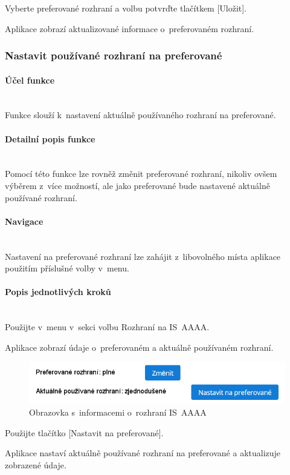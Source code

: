 \documentclass[thesis=M,czech]{FITthesis}[2019/12/23]
\newcommand{\lbparagraph}[1]{\paragraph{#1}\mbox{}\\} %
\newenvironment{reusefigure}[2][htbp]
  {\addtocounter{figure}{-1}%
   \renewcommand{\theHfigure}{dupe-fig}%
   \renewcommand{\thefigure}{\ref{#2}}%
   \renewcommand{\addcontentsline}[3]{}%
   \begin{figure}[#1]}
  {\end{figure}} %
\begin{document}
Vyberte preferované rozhraní a volbu potvrďte tlačítkem [Uložit].

Aplikace zobrazí aktualizované informace o~preferovaném rozhraní.

\newpage
\subsubsection{Nastavit používané rozhraní na preferované}
\lbparagraph{Účel funkce}
Funkce slouží k~nastavení aktuálně používaného rozhraní na preferované.

\lbparagraph{Detailní popis funkce}
Pomocí této funkce lze rovněž změnit preferované rozhraní, nikoliv ovšem výběrem z~více možností, ale jako preferované bude nastavené aktuálně používané rozhraní.

\lbparagraph{Navigace}
Nastavení na preferované rozhraní lze zahájit z~libovolného místa aplikace použitím příslušné volby v~menu.

\lbparagraph{Popis jednotlivých kroků}
Použijte v~menu v~sekci  volbu Rozhraní na IS~AAAA.

Aplikace zobrazí údaje o~preferovaném a aktuálně používaném rozhraní.

\begin{reusefigure}[H]{fig:Obrazovka s~informacemi o~rozhraní IS~AAAA}
  \includegraphics[width=\textwidth]{res/guide/InterfaceSelection.png}
  \caption{Obrazovka s~informacemi o~rozhraní IS~AAAA}
\end{reusefigure}

Použijte tlačítko [Nastavit na preferované].

Aplikace nastaví aktuálně používané rozhraní na preferované a aktualizuje zobrazené údaje.
\end{document}
